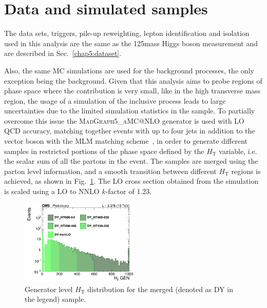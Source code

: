 \section{Data and simulated samples}\label{chap6:datatsets}

The data sets, triggers, pile-up reweighting, lepton identification and isolation used in this analysis are the same as the 125\GeV mass Higgs boson measurement and are described in Sec.~\ref{chap5:dataset}.

Also, the same MC simulations are used for the background processes, the only exception being the \dyll background. Given that this analysis aims to probe regions of phase space where the \dyll contribution is very small, like in the high transverse mass region, the usage of a simulation of the inclusive \dyll process leads to large uncertainties due to the limited simulation statistics in the sample. To partially overcome this issue the \textsc{MadGraph5\_aMC@NLO} generator is used with LO QCD accuracy, matching together events with up to four jets in addition to the vector boson with the MLM matching scheme~\cite{Alwall:2007fs}, in order to generate different \dyll samples in restricted portions of the phase space defined by the $H_\mathrm{T}$ variable, i.e. the scalar sum of all the partons \pt in the event. 
The samples are merged using the parton level information, and a smooth transition between different $H_\mathrm{T}$ regions is achieved, as shown in Fig.~\ref{fig:DY_HT}. The \dyll LO cross section obtained from the simulation is scaled using a LO to NNLO $k$-factor of 1.23.

\begin{figure}[htbp]
\centering
\includegraphics[width=0.5\textwidth]{images/13TeV/log_c_incl_HTGen.png}
\caption{
    Generator level $H_\mathrm{T}$ distribution for the merged \dyll (denoted as DY in the legend) sample.}
    \label{fig:DY_HT}
\end{figure}


